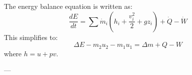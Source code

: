 The energy balance equation is written as:  
\[
\frac{dE}{dt} = \sum \dot{m}_i \left( h_i + \frac{v_i^2}{2} + gz_i \right) + \dot{Q} - \dot{W}
\]  
This simplifies to:  
\[
\Delta E - m_2 u_2 - m_1 u_1 = \Delta m + Q - W
\]  
where \( h = u + pv \).  

---